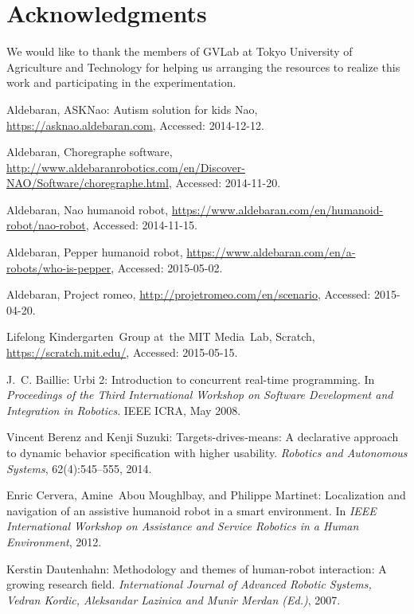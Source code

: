 \documentclass{llncs}
\begin{document}
\section{Acknowledgments}
		We would like to thank the members of GVLab at Tokyo University of Agriculture and Technology for helping us arranging the resources to realize this work and participating in the experimentation.
%
%
\begin{thebibliography}{4}
Aldebaran, ASKNao: Autism solution for kids Nao, \url{https://asknao.aldebaran.com}, Accessed: 2014-12-12.

Aldebaran, Choregraphe software, \url{http://www.aldebaranrobotics.com/en/Discover-NAO/Software/choregraphe.html}, Accessed: 2014-11-20.

Aldebaran, Nao humanoid robot, \url{https://www.aldebaran.com/en/humanoid-robot/nao-robot}, Accessed: 2014-11-15.

Aldebaran, Pepper humanoid robot, \url{https://www.aldebaran.com/en/a-robots/who-is-pepper}, Accessed: 2015-05-02.

Aldebaran, Project romeo, \url{http://projetromeo.com/en/scenario}, Accessed: 2015-04-20.

Lifelong Kindergarten~Group at~the MIT Media~Lab, Scratch, \url{https://scratch.mit.edu/}, Accessed: 2015-05-15.

J.~C. Baillie: Urbi 2: Introduction to concurrent real-time programming. In {\em Proceedings of the Third International Workshop on Software Development and Integration in Robotics}. IEEE ICRA, May 2008.

Vincent Berenz and Kenji Suzuki: Targets-drives-means: {A} declarative approach to dynamic behavior specification with higher usability. {\em Robotics and Autonomous Systems}, 62(4):545--555, 2014.

Enric Cervera, Amine~Abou Moughlbay, and Philippe Martinet: Localization and navigation of an assistive humanoid robot in a smart environment. In {\em IEEE International Workshop on Assistance and Service Robotics in a Human Environment}, 2012.

Kerstin Dautenhahn: Methodology and themes of human-robot interaction: A growing research field. {\em International Journal of Advanced Robotic Systems, Vedran Kordic, Aleksandar Lazinica and Munir Merdan (Ed.)}, 2007.


\end{thebibliography}
\end{document}
